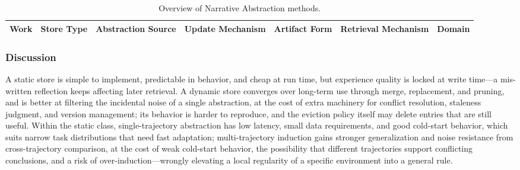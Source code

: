 \begin{table}[t]
\centering
\caption{Overview of Narrative Abstraction methods.}
\label{tab:narrative-abstraction}
\scriptsize
\begin{tabular}{@{}lllllll@{}}
\toprule
Work & Store Type & Abstraction Source & Update Mechanism & Artifact Form & Retrieval Mechanism & Domain \\
\midrule
\bottomrule
\end{tabular}
\end{table}

\subsubsection{Discussion}

A static store is simple to implement, predictable in behavior, and cheap at run time, but experience quality is locked at write time---a mis-written reflection keeps affecting later retrieval. A dynamic store converges over long-term use through merge, replacement, and pruning, and is better at filtering the incidental noise of a single abstraction, at the cost of extra machinery for conflict resolution, staleness judgment, and version management; its behavior is harder to reproduce, and the eviction policy itself may delete entries that are still useful. Within the static class, single-trajectory abstraction has low latency, small data requirements, and good cold-start behavior, which suits narrow task distributions that need fast adaptation; multi-trajectory induction gains stronger generalization and noise resistance from cross-trajectory comparison, at the cost of weak cold-start behavior, the possibility that different trajectories support conflicting conclusions, and a risk of over-induction---wrongly elevating a local regularity of a specific environment into a general rule.

